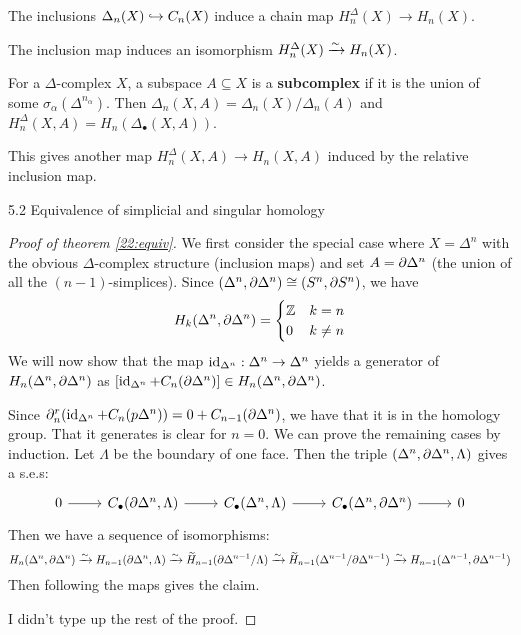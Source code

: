 The inclusions $\Delta_n(X) \hookrightarrow C_n(X)$ induce a chain map $H_n^\Delta(X) \to H_n(X)$.

\begin{thm}\label{22:equiv}
  The inclusion map induces an isomorphism $H_n^\Delta(X) \xrightarrow{\sim} H_n(X)$.
\end{thm}

\begin{defn}
  For a $\Delta$-complex $X$, a subspace $A \subseteq X$ is a \textbf{subcomplex} if it is the union of some $\sigma_\alpha(\Delta^{n_\alpha})$.
  Then $\Delta_n(X,A) = \Delta_n(X)/\Delta_n(A)$ and $H_n^\Delta(X,A)=H_n(\Delta_\bullet(X,A))$.
\end{defn}

This gives another map $H_n^\Delta(X,A) \to H_n(X,A)$ induced by the relative inclusion map.

5.2 Equivalence of simplicial and singular homology

\begin{proof}[Proof of theorem \ref{22:equiv}]
  We first consider the special case where $X=\Delta^n$ with the obvious $\Delta$-complex structure (inclusion maps) and set $A=\partial\Delta^n$ (the union of all the $(n-1)$-simplices).
  Since $(\Delta^n,\partial \Delta^n) \cong (S^n,\partial S^n)$, we have
  \begin{equation*}
    H_k(\Delta^n,\partial\Delta^n)=
    \begin{cases}
      \mathbb{Z} & k=n \\
      0 & k \neq n
    \end{cases}
  \end{equation*}
  We will now show that the map $\operatorname{id}_{\Delta^n}: \Delta^n \to \Delta^n$ yields a generator of $H_n(\Delta^n,\partial\Delta^n)$ as $[\operatorname{id}_{\Delta^n}+C_n(\partial\Delta^n)] \in H_n(\Delta^n,\partial\Delta^n)$.

  Since $\partial_n^r(\operatorname{id}_{\Delta^n}+C_n(p\Delta^n))=0+C_{n-1}(\partial\Delta^n)$, we have that it is in the homology group.
  That it generates is clear for $n=0$.
  We can prove the remaining cases by induction.
  Let $\Lambda$ be the boundary of one face.
  Then the triple $(\Delta^n,\partial\Delta^n,\Lambda)$ gives a s.e.s:
  \begin{equation*}
    \begin{tikzcd}
      0 \ar[r] & C_\bullet(\p\Delta^n,\Lambda) \ar[r] & C_\bullet(\Delta^n,\Lambda) \ar[r] & C_\bullet(\Delta^n,\p\Delta^n) \ar[r] & 0
    \end{tikzcd}
  \end{equation*}
  Then we have a sequence of isomorphisms:
  \[ H_n(\Delta^n,\partial\Delta^n) \xrightarrow{\sim} H_{n-1}(\partial\Delta^n,\Lambda) \xrightarrow{\sim} \widetilde H_{n-1}(\partial\Delta^{n-1}/\Lambda) \xrightarrow{\sim} \widetilde H_{n-1}(\Delta^{n-1}/\partial\Delta^{n-1}) \xrightarrow{\sim} H_{n-1}(\Delta^{n-1},\partial\Delta^{n-1}) \]
  Then following the maps gives the claim.

  I didn't type up the rest of the proof.
\end{proof}
